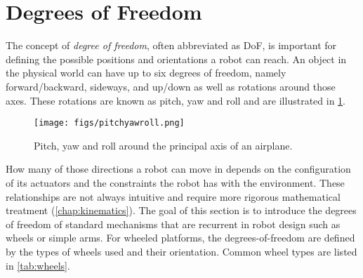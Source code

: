 \section{Degrees of Freedom}\label{sec:dof}


The concept of \emph{degree of freedom}, often abbreviated as DoF, is important for defining the possible positions and orientations a robot can reach. An object in the physical world can have up to six degrees of freedom, namely forward/backward, sideways, and up/down as well as rotations around those axes. These rotations are known as pitch, yaw and roll and are illustrated in \cref{fig:pitchyawandroll}.

\begin{figure}
	\centering
		\texttt{[image: figs/pitchyawroll.png]}
	\caption{Pitch, yaw and roll around the principal axis of an airplane.}
	\label{fig:pitchyawandroll}
\end{figure}

How many of those directions a robot can move in depends on the configuration of its actuators and the constraints the robot has with the environment. These relationships are not always intuitive and require more rigorous mathematical treatment (\cref{chap:kinematics}). The goal of this section is to introduce the degrees of freedom of standard mechanisms that are recurrent in robot design such as wheels or simple arms. For wheeled platforms, the degrees-of-freedom are defined by the types of wheels used and their orientation. Common wheel types are listed in \cref{tab:wheels}.

